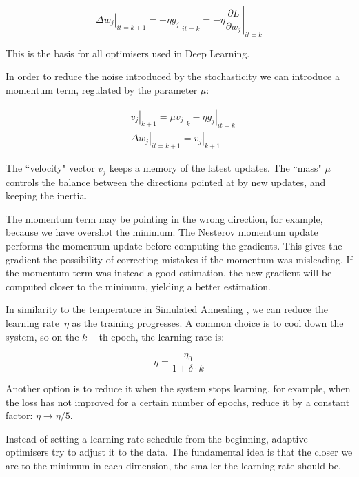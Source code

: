 \begin{equation*}
\left.\Delta w_j\right|_{it=k+1} = - \left.\eta g_j\right|_{it=k} = - \eta \left.\frac{\partial L}{\partial w_j}\right|_{it=k}
\end{equation*}

This is the basis for all optimisers used in Deep Learning.


In order to reduce the noise introduced by the stochasticity we can introduce a momentum term, regulated by the parameter $\mu$:

\begin{align*}
&\left.v_j\right|_{k+1} = \mu \left. v_j\right|_{k} - \left.\eta g_j\right|_{it=k}\\
&\left.\Delta w_j\right|_{it=k+1} = \left.v_j\right|_{k+1}
\end{align*}

The ``velocity" vector $v_j$ keeps a memory of the latest updates.
The ``mass" $\mu$ controls the balance between the directions pointed at by new updates, and keeping the inertia.

The momentum term 
may be pointing in the wrong direction, for example, because we have overshot the minimum.
The Nesterov momentum update~\citep{nag} performs the momentum update before computing the gradients.
This gives the gradient the possibility of correcting mistakes if the momentum was misleading.
If the momentum term was instead a good estimation, the new gradient will be computed closer to the minimum, yielding a better estimation.

In similarity 
to the temperature in Simulated Annealing \citep{genSA}, we can reduce the learning rate~$\eta$ as the training progresses.
A common choice is to cool down the system, so on the $k-$th epoch, the learning rate is:

\begin{equation}
\eta= \frac{\eta_0}{1 + \delta \cdot k}
\end{equation}

Another option is to reduce it when the system stops learning, for example, when the loss has not improved for a certain number of epochs, reduce it by a constant factor: $\eta \rightarrow \eta/5$.

Instead of setting a learning rate schedule from the beginning, adaptive optimisers try to adjust it to the data.
The fundamental idea is that the closer we are to the minimum in each dimension, the smaller the learning rate should be.

